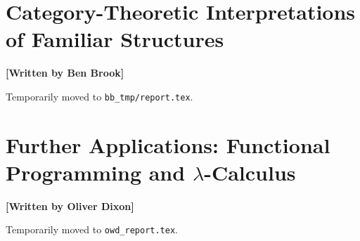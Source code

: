 \documentclass[10pt,a4paper,reqno]{amsart}
\numberwithin{figure}{section}
\begin{document}
\section{Category-Theoretic %
        Interpretations of Familiar Structures}
\begin{flushright}
        \textbf{[Written by Ben Brook]}
\end{flushright}

\noindent Temporarily moved to \texttt{bb\_tmp/report.tex}.

\section{Further Applications: %
        Functional Programming and \texorpdfstring{$\lambda$}{Lambda}-Calculus}
\begin{flushright}
        \textbf{[Written by Oliver Dixon]}
\end{flushright}

\noindent Temporarily moved to \texttt{owd\_report.tex}.
\end{document}
